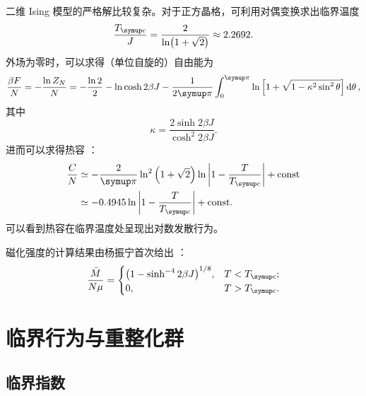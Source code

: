二维 Ising 模型的严格解比较复杂。对于正方晶格，可利用对偶变换求出临界温度
\cite{pathria}
\begin{equation}
  \label{eq:ising-Tc}
  \frac{\Tc}{J} = \frac{2}{\ln(1+\sqrt{2})} \approx \num{2.2692}.
\end{equation}
外场为零时，可以求得（单位自旋的）自由能为
\cite{pathria,onsager1944crystal}
\begin{equation}
  \frac{\beta F}{N}
  = - \frac{\ln Z_N}{N}
  = - \frac{\ln 2}{2} - \ln\cosh 2\beta J
    - \frac{1}{2\pp} \int_0^\pp \ln\qty[1+\sqrt{1-\kappa^2\sin^2\theta}] \dd{\theta},
\end{equation}
其中
\begin{equation}
  \kappa = \frac{2\sinh 2\beta J}{\cosh^2 2\beta J}.
\end{equation}
进而可以求得热容 \cite{pathria}：
\begin{align}
  \label{eq:ising-specific-heat}
  \frac{C}{N}
  & \simeq -\frac{2}{\pp} \ln^2 \qty(1+\sqrt{2}) \ln\abs{1-\frac{T}{\Tc}} + \const \notag \\
  & \simeq \num{-0.4945} \ln\abs{1-\frac{T}{\Tc}} + \const.
\end{align}
可以看到热容在临界温度处呈现出对数发散行为。

磁化强度的计算结果由杨振宁首次给出 \cite{pathria,yang1952spontaneous}：
\begin{equation}
  \label{eq:ising-magnetization}
  \frac{\bar{M}}{N\mu} =
  \begin{cases}
    \qty(1 - \sinh^{-4} 2\beta J)^{1/8}, & T<\Tc; \\
    0, & T>\Tc.
  \end{cases}
\end{equation}

\section{临界行为与重整化群}

\subsection{临界指数}

